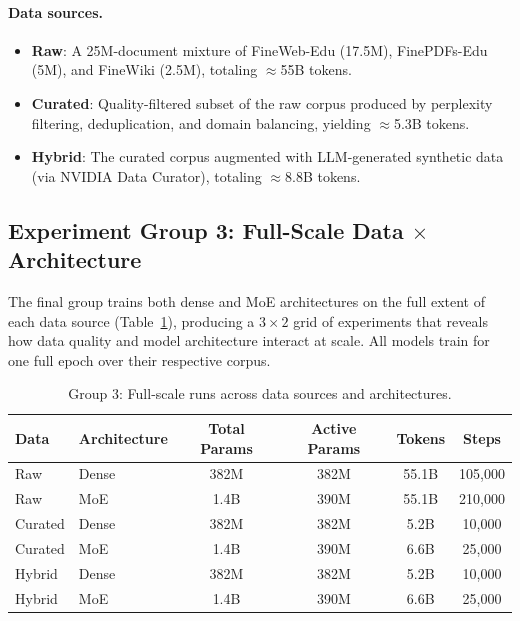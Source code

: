 \paragraph{Data sources.}
\begin{itemize}
    \item \textbf{Raw}: A 25M-document mixture of FineWeb-Edu (17.5M),
          FinePDFs-Edu (5M), and FineWiki (2.5M), totaling $\approx$55B
          tokens.
    \item \textbf{Curated}: Quality-filtered subset of the raw corpus
          produced by perplexity filtering, deduplication, and domain
          balancing, yielding $\approx$5.3B tokens.
    \item \textbf{Hybrid}: The curated corpus augmented with
          LLM-generated synthetic data (via NVIDIA Data Curator),
          totaling $\approx$8.8B tokens.
\end{itemize}

\subsection{Experiment Group 3: Full-Scale Data $\times$ Architecture}
\label{sec:group3}

The final group trains both dense and MoE architectures on the full extent
of each data source (Table~\ref{tab:group3}), producing a $3\times2$ grid
of experiments that reveals how data quality and model architecture interact
at scale.  All models train for one full epoch over their respective corpus.

\begin{table}[h]
\centering
\caption{Group 3: Full-scale runs across data sources and architectures.}
\label{tab:group3}
\begin{tabular}{llcccc}
\toprule
\textbf{Data} & \textbf{Architecture} & \textbf{Total Params} & \textbf{Active Params} & \textbf{Tokens} & \textbf{Steps} \\
\midrule
Raw     & Dense & 382M  & 382M & 55.1B & 105,000 \\
Raw     & MoE   & 1.4B  & 390M & 55.1B & 210,000 \\
Curated & Dense & 382M  & 382M & 5.2B  & 10,000  \\
Curated & MoE   & 1.4B  & 390M & 6.6B  & 25,000  \\
Hybrid  & Dense & 382M  & 382M & 5.2B  & 10,000  \\
Hybrid  & MoE   & 1.4B  & 390M & 6.6B  & 25,000  \\
\bottomrule
\end{tabular}
\end{table}

